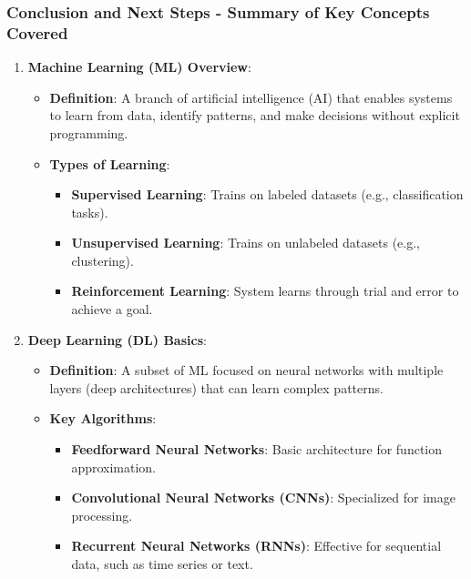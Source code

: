 \documentclass[aspectratio=169]{beamer}
\begin{document}
\begin{frame}[fragile]
    \frametitle{Conclusion and Next Steps - Summary of Key Concepts Covered}
    
    \begin{enumerate}
        \item \textbf{Machine Learning (ML) Overview}:
        \begin{itemize}
            \item \textbf{Definition}: A branch of artificial intelligence (AI) that enables systems to learn from data, identify patterns, and make decisions without explicit programming.
            \item \textbf{Types of Learning}:
            \begin{itemize}
                \item \textbf{Supervised Learning}: Trains on labeled datasets (e.g., classification tasks).
                \item \textbf{Unsupervised Learning}: Trains on unlabeled datasets (e.g., clustering).
                \item \textbf{Reinforcement Learning}: System learns through trial and error to achieve a goal.
            \end{itemize}
        \end{itemize}
        
        \item \textbf{Deep Learning (DL) Basics}:
        \begin{itemize}
            \item \textbf{Definition}: A subset of ML focused on neural networks with multiple layers (deep architectures) that can learn complex patterns.
            \item \textbf{Key Algorithms}:
            \begin{itemize}
                \item \textbf{Feedforward Neural Networks}: Basic architecture for function approximation.
                \item \textbf{Convolutional Neural Networks (CNNs)}: Specialized for image processing.
                \item \textbf{Recurrent Neural Networks (RNNs)}: Effective for sequential data, such as time series or text.
            \end{itemize}
        \end{itemize}
    \end{enumerate}
\end{frame}
\end{document}
